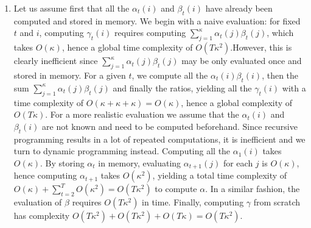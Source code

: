 \documentclass[a4paper,11pt, hidelinks]{article}
\begin{document}
\begin{enumerate}[label=(\alph*)]
	\item Let us assume first that all the $\alpha_t(i)$ and $\beta_t(i)$ have already been computed and stored in memory. We begin with a naive evaluation: for fixed $t$ and $i$, computing $\gamma_t(i)$ requires computing $\sum_{j=1}^\kappa \alpha_t(j)\beta_t(j)$, which takes $O(\kappa)$, hence a global time complexity of $O(T\kappa^2)$.\newline However, this is clearly inefficient since $\sum_{j=1}^\kappa \alpha_t(j)\beta_t(j)$ may be only evaluated once and stored in memory. For a given $t$, we compute all the $\alpha_t(i)\beta_t(i)$, then the sum $\sum_{j=1}^\kappa \alpha_t(j)\beta_t(j)$ and finally the ratios, yielding all the $\gamma_t(i)$ with a time complexity of $O(\kappa + \kappa + \kappa) = O(\kappa)$, hence a global complexity of $O(T\kappa)$.\newline
	\newline
	For a more realistic evaluation we assume that the $\alpha_t(i)$ and $\beta_t(i)$ are not known and need to be computed beforehand. Since recursive programming results in a lot of repeated computations, it is inefficient and we turn to dynamic programming instead. Computing all the $\alpha_1(i)$ takes $O(\kappa)$. By storing $\alpha_{t}$ in memory, evaluating $\alpha_{t+1}(j)$ for each $j$ is $O(\kappa)$, hence computing $\alpha_{t+1}$ takes $O(\kappa^2)$, yielding a total time complexity of $O(\kappa) + \sum_{t=2}^T O(\kappa^2) = O(T\kappa^2)$ to compute $\alpha$. In a similar fashion, the evaluation of $\beta$ requires $O(T\kappa^2)$ in time. Finally, computing $\gamma$ from scratch has complexity $O(T\kappa^2) + O(T\kappa^2) + O(T\kappa) = O(T\kappa^2)$.


\end{enumerate}
\end{document}

